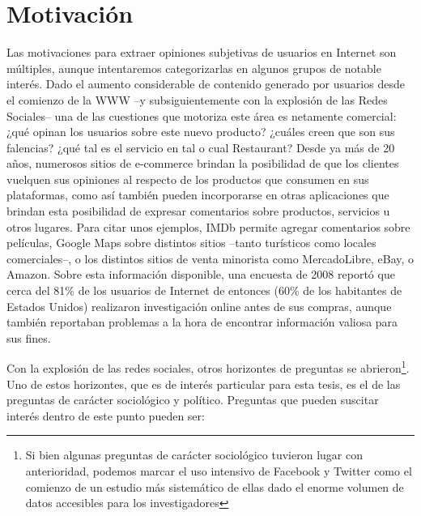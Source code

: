 \section{Motivación}

Las motivaciones para extraer opiniones subjetivas de usuarios en Internet son múltiples, aunque intentaremos categorizarlas en algunos grupos de notable interés. Dado el aumento considerable de contenido generado por usuarios desde el comienzo de la WWW --y subsiguientemente con la explosión de las Redes Sociales-- una de las cuestiones que motoriza este área es netamente comercial: ¿qué opinan los usuarios sobre este nuevo producto? ¿cuáles creen que son sus falencias? ¿qué tal es el servicio en tal o cual Restaurant? Desde ya más de 20 años, numerosos sitios de e-commerce brindan la posibilidad de que los clientes vuelquen sus opiniones al respecto de los productos que consumen en sus plataformas, como así también pueden incorporarse en otras aplicaciones que brindan esta posibilidad de expresar comentarios sobre productos, servicios u otros lugares. Para citar unos ejemplos, IMDb permite agregar comentarios sobre películas, Google Maps sobre distintos sitios --tanto turísticos como locales comerciales--, o los distintos sitios de venta minorista como MercadoLibre, eBay, o Amazon. Sobre esta información disponible, una encuesta de 2008 \cite{horrigan2008online} reportó que cerca del 81\% de los usuarios de Internet de entonces (60\% de los habitantes de Estados Unidos) realizaron investigación online antes de sus compras, aunque también reportaban problemas a la hora de encontrar información valiosa para sus fines.

Con la explosión de las redes sociales, otros horizontes de preguntas se abrieron\footnote{Si bien algunas preguntas de carácter sociológico tuvieron lugar con anterioridad, podemos marcar el uso intensivo de Facebook y Twitter como el comienzo de un estudio más sistemático de ellas dado el enorme volumen de datos accesibles para los investigadores}. Uno de estos horizontes, que es de interés particular para esta tesis, es el de las preguntas de carácter sociológico y político. Preguntas que pueden suscitar interés dentro de este punto pueden ser:

